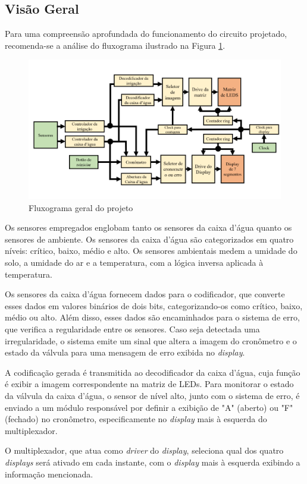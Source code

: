\documentclass[
	article,			%
	11pt,				%
	oneside,			%
	a4paper,			%
	english,			%
	brazil,				%
	sumario=tradicional
	]{abntex2}
\begin{document}
\subsection{Visão Geral}

Para uma compreensão aprofundada do funcionamento do circuito projetado, recomenda-se a análise do fluxograma ilustrado na Figura \ref{fig:fluxograma}.

\begin{figure} [H]
    \centering
    \includegraphics[width=0.75\linewidth]{fluxograma.png}
    \caption{Fluxograma geral do projeto}
    \label{fig:fluxograma}
\end{figure}

Os sensores empregados englobam tanto os sensores da caixa d'água quanto os sensores de ambiente. Os sensores da caixa d'água são categorizados em quatro níveis: crítico, baixo, médio e alto. Os sensores ambientais medem a umidade do solo, a umidade do ar e a temperatura, com a lógica inversa aplicada à temperatura. 

Os sensores da caixa d'água fornecem dados para o codificador, que converte esses dados em valores binários de dois bits, categorizando-os como crítico, baixo, médio ou alto. Além disso, esses dados são encaminhados para o sistema de erro, que verifica a regularidade entre os sensores. Caso seja detectada uma irregularidade, o sistema emite um sinal que altera a imagem do cronômetro e o estado da válvula para uma mensagem de erro exibida no \textit{display}.

A codificação gerada é transmitida ao decodificador da caixa d'água, cuja função é exibir a imagem correspondente na matriz de LEDs. Para monitorar o estado da válvula da caixa d'água, o sensor de nível alto, junto com o sistema de erro, é enviado a um módulo responsável por definir a exibição de "A" (aberto) ou "F" (fechado) no cronômetro, especificamente no \textit{display} mais à esquerda do multiplexador. 

O multiplexador, que atua como \textit{driver} do \textit{display}, seleciona qual dos quatro \textit{displays} será ativado em cada instante, com o \textit{display} mais à esquerda exibindo a informação mencionada.
\end{document}

